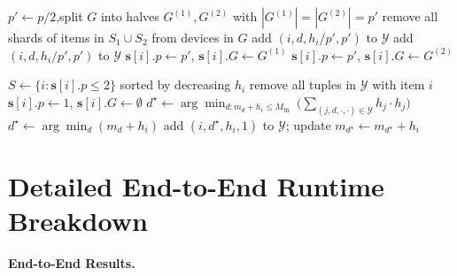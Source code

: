 \begin{algorithm}
\begin{algorithmic}[1]
\vspace{0.3em}
\Statex
{}
  \State $p' \gets p/2$,\quad split $G$ into halves $G^{(1)},G^{(2)}$ with $|G^{(1)}|=|G^{(2)}|=p'$
  \State remove all shards of items in $S_1\cup S_2$ from devices in $G$
    add $(i,d,h_i/p',p')$ to $\mathcal{Y}$ \EndFor \EndFor
    add $(i,d,h_i/p',p')$ to $\mathcal{Y}$ \EndFor \EndFor
   $\mathbf{s}[i].p\gets p'$, $\mathbf{s}[i].G\gets G^{(1)}$ \EndFor
   $\mathbf{s}[i].p\gets p'$, $\mathbf{s}[i].G\gets G^{(2)}$ \EndFor
\EndProcedure

\vspace{0.3em}
\Statex
{}
\State $S \gets \{i:\mathbf{s}[i].p\le 2\}$ sorted by decreasing $h_i$
  \State remove all tuples in $\mathcal{Y}$ with item $i$
  \State $\mathbf{s}[i].p\gets 1$, $\mathbf{s}[i].G\gets \emptyset$
\EndFor
{}
  \State $d^\star \gets \arg\min_{d: m_d+h_i\le M_{\mathrm{th}}}\ \Big(\sum_{(j,d,\cdot,\cdot)\in\mathcal{Y}} h_j\cdot h_j\Big)$
   \State $d^\star \gets \arg\min_d (m_d+h_i)$ \EndIf
  \State add $(i,d^\star,h_i,1)$ to $\mathcal{Y}$; update $m_{d^\star}\gets m_{d^\star}+h_i$
\EndFor
\EndProcedure
\end{algorithmic}
\end{algorithm}

\section{Detailed End-to-End Runtime Breakdown}\label{appendix:e2e_breakdown}

\noindent\textbf{End-to-End Results.}~


